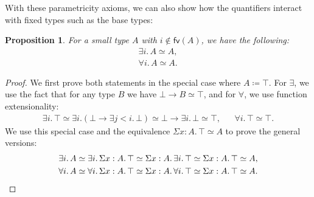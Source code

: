 \documentclass[10pt,a4paper]{article}
\newtheorem{proposition}[theorem]{Proposition}
\theoremstyle{definition}
\theoremstyle{remark}
\renewcommand{\.}{.\,} %
\renewcommand{\:}{:} %
\newcommand{\0}{\mathbf{0}}
\newcommand{\1}{\mathbf{1}}
\newcommand\<\langle
\renewcommand\>\rangle
\renewcommand\sf\mathsf
\theoremstyle{remark}
\begin{document}
With these parametricity axioms, we can also show how the quantifiers interact with fixed types such as the base types: 
\begin{proposition}
    For a small type \(A\) with \(i\notin\sf{fv}(A)\), we have the following: \begin{align*}
        \exists i.\,A\simeq A, \tag{\(\exists\) parametric over a small fixed type} \\
        \forall i.\,A\simeq A. \tag{\(\forall\) parametric over a small fixed type}
    \end{align*}
\end{proposition}
\begin{proof}
    We first prove both statements in the special case where \(A\coloneqq\top\).
    For \(\exists\), we use the fact that for any type \(B\) we have \(\bot\to B\simeq\top\), and for \(\forall\), we use function extensionality: \begin{align*}
        \exists i.\,\top
        \simeq\exists i.(\bot\to\exists j<i.\,\bot)
        \simeq\bot\to\exists i.\,\bot
        \simeq \top, &&
        \forall i.\,\top\simeq\top.
    \end{align*}
    We use this special case and the equivalence \(\Sigma x:A.\,\top\simeq A\) to prove the general versions: \begin{gather*}
        \exists i.\,A\simeq\exists i.\,\Sigma x:A.\,\top\simeq\Sigma x:A.\,\exists i.\,\top\simeq\Sigma x:A.\,\top\simeq A, \\
        \forall i.\,A\simeq\forall i.\,\Sigma x:A.\,\top\simeq\Sigma x:A.\,\forall i.\,\top\simeq\Sigma x:A.\,\top\simeq A.\qedhere
    \end{gather*}
\end{proof}
% 
    
\end{document}
